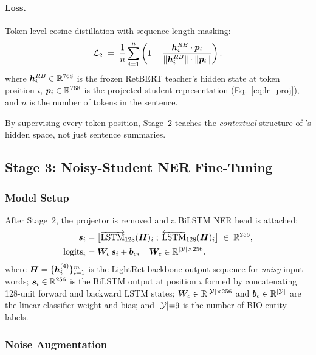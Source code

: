 \paragraph{Loss.}
Token-level cosine distillation with sequence-length masking:
\begin{equation}
  \mathcal{L}_{2}
  \;=\;
  \frac{1}{n} \sum_{i=1}^{n}
  \left(
    1 - \frac{\bm{h}^{RB}_{i} \cdot \bm{p}_{i}}
             {\|\bm{h}^{RB}_{i}\| \cdot \|\bm{p}_{i}\|}
  \right).
  \label{eq:loss2}
\end{equation}
\noindent where $\bm{h}^{RB}_{i} \in \mathbb{R}^{768}$ is the frozen RetBERT teacher's hidden state at token position $i$, $\bm{p}_{i} \in \mathbb{R}^{768}$ is the projected student representation (Eq.~\ref{eq:lr_proj}), and $n$ is the number of tokens in the sentence.

By supervising every token position, Stage~2 teaches \LightRet{} the
\emph{contextual} structure of \RetBERT{}'s hidden space, not just sentence
summaries.

\subsection{Stage 3: Noisy-Student NER Fine-Tuning}
\label{subsec:stage3}

\subsubsection{Model Setup}

After Stage~2, the projector is removed and a BiLSTM NER head is attached:
\begin{align}
  \bm{s}_i &= \bigl[
             \overrightarrow{\text{LSTM}}_{128}(\bm{H})_i \;;\;
             \overleftarrow{\text{LSTM}}_{128}(\bm{H})_i
           \bigr]
           \;\in\; \mathbb{R}^{256},
  \label{eq:ner_bilstm}\\
  \text{logits}_i &= \bm{W}_{c}\,\bm{s}_i + \bm{b}_{c},
  \quad \bm{W}_{c} \in \mathbb{R}^{|\mathcal{Y}| \times 256}.
  \label{eq:ner_logits}
\end{align}
where $\bm{H} = \{\bm{h}^{(4)}_i\}_{i=1}^{m}$ is the LightRet backbone output sequence for \emph{noisy} input words; $\bm{s}_i \in \mathbb{R}^{256}$ is the BiLSTM output at position $i$ formed by concatenating 128-unit forward and backward LSTM states; $\bm{W}_{c} \in \mathbb{R}^{|\mathcal{Y}| \times 256}$ and $\bm{b}_{c} \in \mathbb{R}^{|\mathcal{Y}|}$ are the linear classifier weight and bias; and $|\mathcal{Y}|{=}9$ is the number of BIO entity labels.

\subsubsection{Noise Augmentation}

